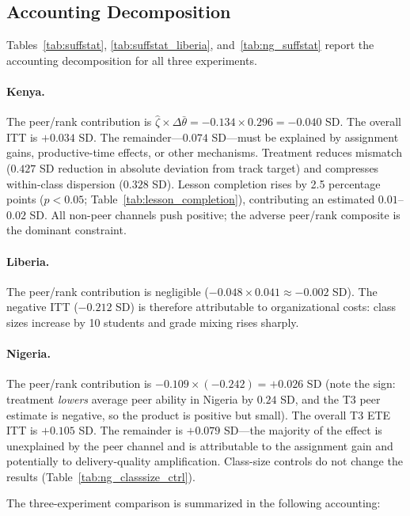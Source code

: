 \documentclass[11pt]{article}
\begin{document}
\subsection{Accounting Decomposition}

Tables~\ref{tab:suffstat}, \ref{tab:suffstat_liberia}, and~\ref{tab:ng_suffstat} report the accounting decomposition for all three experiments.

\paragraph{Kenya.} The peer/rank contribution is $\hat{\zeta} \times \Delta\bar{\theta} = -0.134 \times 0.296 = -0.040$ SD. The overall ITT is $+0.034$ SD. The remainder---$0.074$ SD---must be explained by assignment gains, productive-time effects, or other mechanisms. Treatment reduces mismatch ($0.427$ SD reduction in absolute deviation from track target) and compresses within-class dispersion ($0.328$ SD). Lesson completion rises by 2.5 percentage points ($p < 0.05$; Table~\ref{tab:lesson_completion}), contributing an estimated $0.01$--$0.02$ SD. All non-peer channels push positive; the adverse peer/rank composite is the dominant constraint.

\paragraph{Liberia.} The peer/rank contribution is negligible ($-0.048 \times 0.041 \approx -0.002$ SD). The negative ITT ($-0.212$ SD) is therefore attributable to organizational costs: class sizes increase by 10 students and grade mixing rises sharply.

\paragraph{Nigeria.} The peer/rank contribution is $-0.109 \times (-0.242) = +0.026$ SD (note the sign: treatment \emph{lowers} average peer ability in Nigeria by $0.24$ SD, and the T3 peer estimate is negative, so the product is positive but small). The overall T3 ETE ITT is $+0.105$ SD. The remainder is $+0.079$ SD---the majority of the effect is unexplained by the peer channel and is attributable to the assignment gain and potentially to delivery-quality amplification. Class-size controls do not change the results (Table~\ref{tab:ng_classsize_ctrl}).

The three-experiment comparison is summarized in the following accounting:
\end{document}
